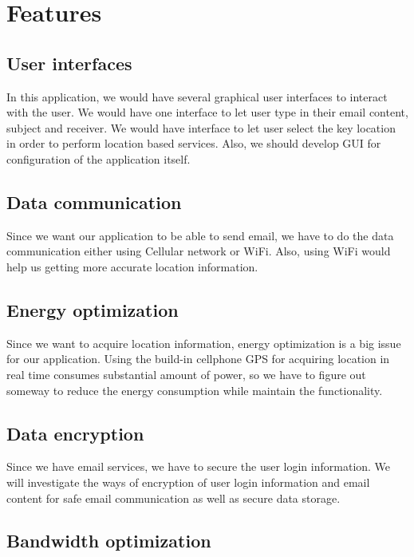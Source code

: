 \documentclass[a4paper,12pt]{article}
\begin{document}
	
	\section{Features}
	\subsection{User interfaces}
	
	In this application, we would have several graphical user interfaces to interact with the user. We would have one interface to let user type in their email content, subject and receiver. We would have interface to let user select the key location in order to perform location based services. Also, we should develop GUI for configuration of the application itself.
	
	\subsection{Data communication}
	
	Since we want our application to be able to send email, we have to do the data communication either using Cellular network or WiFi. Also, using WiFi would help us getting more accurate location information.
	
	\subsection{Energy optimization}
	
	Since we want to acquire location information, energy optimization is a big issue for our application. Using the build-in cellphone GPS for acquiring location in real time consumes substantial amount of power, so we have to figure out someway to reduce the energy consumption while maintain the functionality.
	
	\subsection{Data encryption}
	
	Since we have email services, we have to secure the user login information. We will investigate the ways of encryption of user login information and email content for safe email communication as well as secure data storage.
	
	\subsection{Bandwidth optimization}
	
	
	

	
	
\end{document}
